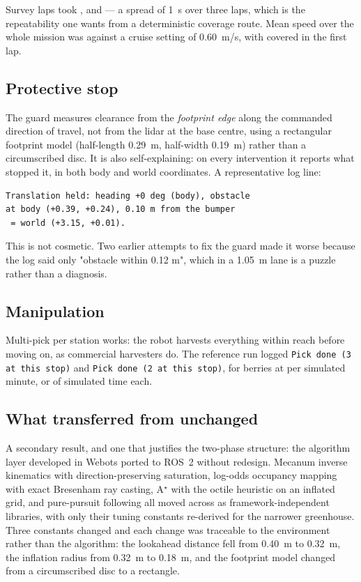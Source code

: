 \documentclass[conference]{IEEEtran}
\begin{document}
Survey laps took ,  and
 --- a spread of \SI{1}{s} over three laps, which is the
repeatability one wants from a deterministic coverage route. Mean speed over
the whole mission was  against a cruise setting of
\SI{0.60}{m/s}, with  covered in the first lap.

\subsection{Protective stop}

The guard measures clearance from the \emph{footprint edge} along the
commanded direction of travel, not from the lidar at the base centre, using a
rectangular footprint model (half-length \SI{0.29}{m}, half-width
\SI{0.19}{m}) rather than a circumscribed disc. It is also self-explaining: on
every intervention it reports what stopped it, in both body and world
coordinates. A representative log line:

\begin{lstlisting}[style=bash]
Translation held: heading +0 deg (body), obstacle
at body (+0.39, +0.24), 0.10 m from the bumper
 = world (+3.15, +0.01).
\end{lstlisting}

This is not cosmetic. Two earlier attempts to fix the guard made it worse
because the log said only "obstacle within 0.12 m", which in a \SI{1.05}{m}
lane is a puzzle rather than a diagnosis.

\subsection{Manipulation}

Multi-pick per station works: the robot harvests everything within reach
before moving on, as commercial harvesters do. The reference run logged
\texttt{Pick done (3 at this stop)} and \texttt{Pick done (2 at this stop)},
for  berries at  per simulated minute, or
 of simulated time each.

\subsection{What transferred from \phaseA{} unchanged}

A secondary result, and one that justifies the two-phase structure: the
algorithm layer developed in Webots ported to ROS~2 without redesign.
Mecanum inverse kinematics with direction-preserving saturation, log-odds
occupancy mapping with exact Bresenham ray casting, A$^\star$ with the octile
heuristic on an inflated grid, and pure-pursuit following all moved across as
framework-independent libraries, with only their tuning constants re-derived
for the narrower greenhouse. Three constants changed and each change was
traceable to the environment rather than the algorithm: the lookahead distance
fell from \SI{0.40}{m} to \SI{0.32}{m}, the inflation radius from
\SI{0.32}{m} to \SI{0.18}{m}, and the footprint model changed from a
circumscribed disc to a rectangle.
\end{document}
